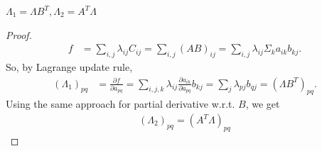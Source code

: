 \begin{claim}
$\Lambda_1 = \Lambda B^T, \Lambda_2 = A^T \Lambda$
\end{claim}

\begin{proof}
\begin{align*}
f &= \sum_{i,j} \lambda_{ij} C_{ij} = \sum_{i,j} (AB)_{ij} = \sum_{i,j} \lambda_{ij} \Sigma_k a_{ik}b_{kj}.
\end{align*}
So, by Lagrange update rule, 
\begin{align*}
(\Lambda_1)_{pq} &= \frac{\partial f}{\partial a_{pq}} = \sum_{i,j,k} \lambda_{ij} \frac{\partial a_{ik}}{\partial a_{pq}} b_{kj} = \sum_j \lambda_{pj} b_{qj} = (\Lambda B^T)_{pq}.
\end{align*}
Using the same approach for partial derivative w.r.t. $B$, we get 
\begin{align*}
(\Lambda_2)_{pq} = (A^T \Lambda)_{pq}
\end{align*}
\end{proof}
